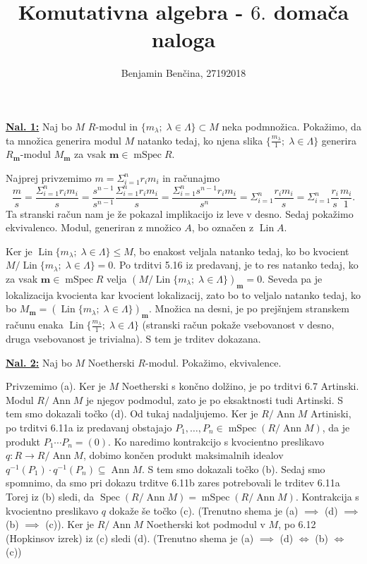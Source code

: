 \documentclass[a4paper, 12pt]{article}
\title{Komutativna algebra - $6.$ domača naloga}
\author{Benjamin Benčina, 27192018}
\DeclareMathOperator{\Lin}{Lin}
\DeclareMathOperator{\Ann}{Ann}
\DeclareMathOperator{\Spec}{Spec}
\DeclareMathOperator{\mSpec}{mSpec}
\begin{document}
\maketitle

\underline{\textbf{Nal. 1:}}
Naj bo $M$ $R$-modul in $\lbrace m_\lambda ; \; \lambda \in \Lambda\rbrace \subset M$ neka podmnožica.
Pokažimo, da ta množica generira modul $M$ natanko tedaj, ko njena slika $\lbrace \frac{m_\lambda}{1} ;\; \lambda \in \Lambda\rbrace$ generira $R_\mathbf{m}$-modul $M_\mathbf{m}$ za vsak $\mathbf{m} \in \mSpec R$. 

Najprej privzemimo $m = \Sigma_{i=1}^{n}r_im_i$ in računajmo
\[
\frac{m}{s} = \frac{\Sigma_{i=1}^{n}r_im_i}{s} = \frac{s^{n-1}}{s^{n-1}} \frac{\Sigma_{i=1}^{n}r_im_i}{s} = \frac{\Sigma_{i=1}^{n}s^{n-1}r_im_i}{s^n} = \Sigma_{i=1}^n \frac{r_im_i}{s} = \Sigma_{i=1}^n \frac{r_i}{s}\frac{m_i}{1}.
\]
Ta stranski račun nam je že pokazal implikacijo iz leve v desno.
Sedaj pokažimo ekvivalenco. Modul, generiran z množico $A$, bo označen z $\Lin A$.

Ker je $\Lin\lbrace m_\lambda ;\;\lambda \in \Lambda\rbrace \leq M$, bo enakost veljala natanko tedaj, ko bo kvocient $M/\Lin\lbrace m_\lambda ;\;\lambda \in \Lambda\rbrace = 0$. Po trditvi 5.16 iz predavanj, je to res natanko tedaj, ko za vsak $\mathbf{m} \in \mSpec R$ velja $\left(M/\Lin\lbrace m_\lambda ;\;\lambda \in \Lambda\rbrace\right)_\mathbf{m} = 0$. Seveda pa je lokalizacija kvocienta kar kvocient lokalizacij, zato bo to veljalo natanko tedaj, ko bo $M_\mathbf{m} = (\Lin\lbrace m_\lambda ;\;\lambda \in \Lambda\rbrace)_\mathbf{m}$. Množica na desni, je po prejšnjem stranskem računu enaka $\Lin\lbrace \frac{m_\lambda}{1} ;\; \lambda \in \Lambda\rbrace$ (stranski račun pokaže vsebovanost v desno, druga vsebovanost je trivialna). S tem je trditev dokazana.

\underline{\textbf{Nal. 2:}}
Naj bo $M$ Noetherski $R$-modul. Pokažimo, ekvivalence.

Privzemimo (a). Ker je $M$ Noetherski s končno dolžino, je po trditvi 6.7 Artinski. Modul $R/\Ann M$ je njegov podmodul, zato je po eksaktnosti tudi Artinski. S tem smo dokazali točko (d). Od tukaj nadaljujemo. Ker je $R/\Ann M$ Artiniski, po trditvi 6.11a iz predavanj obstajajo $P_1,\dots,P_n \in \mSpec (R/\Ann M)$, da je produkt $P_1\cdots P_n = (0)$. Ko naredimo kontrakcijo s kvocientno preslikavo $q\colon R \to R/\Ann M$, dobimo končen produkt maksimalnih idealov $q^{-1}(P_1)\cdot q^{-1}(P_n) \subseteq \Ann M$. S tem smo dokazali točko (b). Sedaj smo spomnimo, da smo pri dokazu trditve 6.11b zares potrebovali le trditev 6.11a Torej iz (b) sledi, da $\Spec (R/\Ann M) = \mSpec (R/\Ann M)$. Kontrakcija s kvocientno preslikavo $q$ dokaže še točko (c).
(Trenutno shema je (a) $\implies$ (d) $\implies$ (b) $\implies$ (c)). Ker je $R/\Ann M$ Noetherski kot podmodul v $M$, po 6.12 (Hopkinsov izrek) iz (c) sledi (d).
(Trenutno shema je (a) $\implies$ (d) $\iff$ (b) $\iff$ (c))
\end{document}
